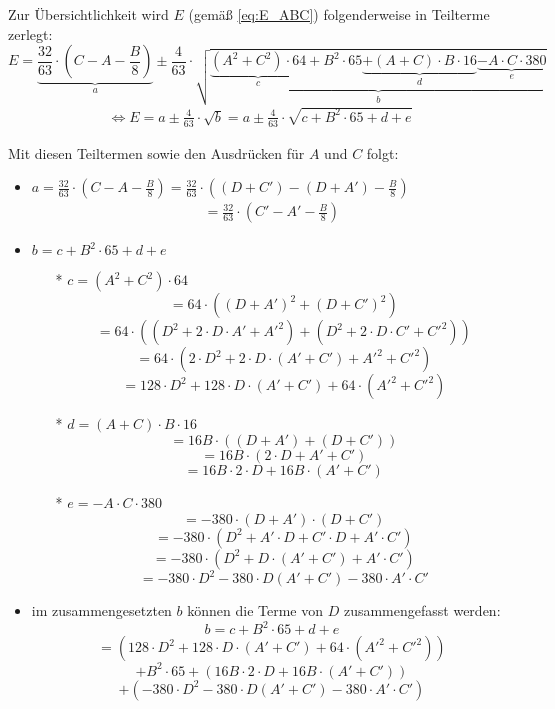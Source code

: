 \documentclass[12pt,a4paper]{article}
\begin{document}
Zur Übersichtlichkeit wird $E$ (gemäß \eqref{eq:E_ABC}) folgenderweise in Teilterme zerlegt:
 $$ E = \underbrace{\frac{32}{63}\cdot \left( C-A - \frac{B}{8}\right) }_{a} \pm 
    \frac{4}{63}
  \cdot 
  \sqrt{
  \underbrace{
\underbrace{
     \left( A^2 + C ^2\right)\cdot 64}_c
+ B^2 \cdot 65 
\underbrace{ + \left( A+C\right) \cdot B \cdot 16}_d
\underbrace{ - A\cdot C \cdot 380}_e
 }_b}$$
\begin{gather}
\label{eq:E_in_abc}
\Leftrightarrow E = a \pm \frac{4}{63} \cdot \sqrt{b} 
= a \pm \frac{4}{63} \cdot \sqrt{c + B ^2 \cdot 65 + d + e} 
\end{gather}

Mit diesen Teiltermen sowie den Ausdrücken für $A$ und $C$ folgt: 
\begin{itemize}
\item $a = \frac{32}{63}\cdot \left( C-A - \frac{B}{8}\right)  = \frac{32}{63}\cdot \left( \left( D+C'\right) - \left( D+A'\right) - \frac{B}{8}\right) $
\begin{gather}
 = \frac{32}{63}\cdot \left( C' - A' 
- \frac{B}{8}\right) 
\label{eq:a_ACeingesetzt}
\end{gather}

\item $b= c + B ^2 \cdot 65 + d + e$
\begin{itemize}
\item[*] $c = \left( A^2 + C ^2\right)\cdot 64 $
$$ =64\cdot  \left( \left( D+A'\right)^2 +  \left( D+C'\right) ^2\right) $$
$$ = 64\cdot\left( \left( D^2 + 2 \cdot D \cdot A' +{A'}^2\right) +  
\left( D^2 + 2 \cdot D \cdot C' +C'^2\right) \right) $$
$$ = 64\cdot\left( 2 \cdot D^2 + 2 \cdot D \cdot \left( A' + C'\right) + A'^2 + C'^2
 \right) $$
 $$ = 128\cdot D^2 + 128 \cdot D \cdot \left( A' + C'\right) + 64\cdot \left( A'^2 + C'^2
 \right) $$
 
\item[*] $d =  \left( A+C\right) \cdot B \cdot 16$ 
$$ =16 B \cdot \left( \left( D+A'\right)+\left( D+C'\right)\right)$$ 
$$ =16 B \cdot \left(
2 \cdot D + A' + C' 
\right)$$ 
$$ = 16 B \cdot 
2 \cdot D + 16 B \cdot \left( A' + C' 
\right)$$ 

\item[*] $e=  - A\cdot C \cdot 380 $ 
$$ =  - 380\cdot \left( D+A'\right)\cdot \left( D+C'\right) $$
$$ =  - 380\cdot \left( 
D ^2 + A' \cdot D + C' \cdot D + A' \cdot C' 
\right) $$
$$ =  - 380\cdot \left( 
D ^2 + D \cdot \left( A' + C' \right) + A' \cdot C' 
\right) $$
$$ =  - 380\cdot 
D ^2 - 380\cdot D   \left( A' + C' \right) 
-380\cdot A' \cdot C' $$
\end{itemize}
\item im zusammengesetzten $b$ können die Terme von $D$ zusammengefasst werden: 
$$b= c + B ^2 \cdot 65 + d + e$$
$$=
 \left( 128\cdot D^2 + 128 \cdot D \cdot \left( A' + C'\right) + 64\cdot \left( A'^2 + C'^2 \right)\right)  $$
 $$ + B ^2 \cdot 65
+ \left(16 B \cdot 2 \cdot D + 16 B \cdot \left( A' + C' \right) \right) $$
$$
+ \left(  - 380\cdot D ^2 - 380\cdot D   \left( A' + C' \right) -380\cdot A' \cdot C'\right)$$


\end{itemize}
\end{document}

